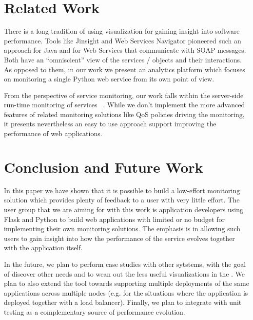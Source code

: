 \documentclass[conference]{IEEEtran}
\begin{document}
\section{Related Work}
\label{sec:related}

There is a long tradition of using visualization for gaining insight into software performance. Tools like Jinsight \cite{Pauw02a} and Web Services Navigator \cite{Pauw05} pioneered such an approach for Java and for Web Services that communicate with SOAP messages. Both have an ``omniscient'' view of the services / objects and their interactions. As opposed to them, in our work we present an analytics platform which focuses on monitoring a single Python web service from its own point of view.

From the perspective of service monitoring, our work falls within the server-side run-time monitoring of services ~\cite{ghezzi2007run}. While we don't implement the more advanced features of related monitoring solutions like QoS policies driving the monitoring, it presents nevertheless an easy to use approach support improving the performance of web applications. 




\section{Conclusion and Future Work}

In this paper we have shown that it is possible to build a low-effort monitoring solution which provides plenty of feedback to a user with very little effort. The user group that we are aiming for with this work is application developers using Flask and Python to build web applications with limited or no budget for implementing their own monitoring solutions. The emphasis is in allowing such users to gain insight into how the performance of the service evolves together with the application itself.

In the future, we plan to perform case studies with other sytstems, with the goal of discover other needs and to wean out the less useful visualizations in the \tool. We plan to also extend the tool towards supporting multiple deployments of the same applications across multiple nodes (e.g. for the situations where the application is deployed together with a load balancer). Finally, we plan to integrate \tool with unit testing as a complementary source of performance evolution.






\end{document}
